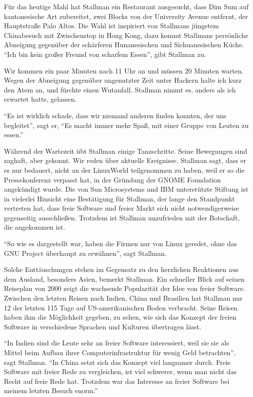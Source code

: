 Für das heutige Mahl hat Stallman ein Restaurant ausgesucht, dass Dim Sum auf kantonesische Art zubereitet, zwei Blocks von der University Avenue entfernt, der Hauptstraße Palo Altos. Die Wahl ist inspiriert von Stallmans jüngstem Chinabesuch mit Zwischenstop in Hong Kong, dazu kommt Stallmans persönliche Abneigung gegenüber der schärferen Hunanesischen und Sichuanesischen Küche. "`Ich bin kein großer Freund von scharfem Essen"', gibt Stallman zu.

Wir kommen ein paar Minuten nach 11 Uhr an und müssen 20 Minuten warten. Wegen der Abneigung gegenüber ungenutzter Zeit unter Hackern halte ich kurz den Atem an, und fürchte einen Wutanfall. Stallman nimmt es, anders als ich erwartet hatte, gelassen.

"`Es ist wirklich schade, dass wir niemand anderen finden konnten, der uns begleitet"', sagt er, "`Es macht immer mehr Spaß, mit einer Gruppe von Leuten zu essen."'

Während der Wartezeit übt Stallman einige Tanzschritte. Seine Bewegungen sind zaghaft, aber gekonnt. Wir reden über aktuelle Ereignisse. Stallman sagt, dass er es nur bedauert, nicht an der LinuxWorld teilgenommen zu haben, weil er so die Pressekonferenz verpasst hat, in der Gründung der GNOME Foundation angekündigt wurde. Die von Sun Microsystems und IBM unterstützte Stiftung ist in vielerlei Hinsicht eine Bestätigung für Stallman, der lange den Standpunkt vertreten hat, dass freie Software und freier Markt sich nicht notwendigerweise gegenseitig ausschließen. Trotzdem ist Stallman unzufrieden mit der Botschaft, die angekommen ist.

"`So wie es dargestellt war, haben die Firmen nur von Linux geredet, ohne das GNU Project überhaupt zu erwähnen"', sagt Stallman.

Solche Enttäuschungen stehen im Gegensatz zu den herzlichen Reaktionen aus dem Ausland, besonders Asien, bemerkt Stallman. Ein schneller Blick auf seinen Reiseplan von 2000 zeigt die wachsende Popularität der Idee von freier Software. Zwischen den letzten Reisen nach Indien, China und Brasilien hat Stallman nur 12 der letzten 115 Tage auf US-amerikanischen Boden verbracht. Seine Reisen haben ihm die Möglichkeit gegeben, zu sehen, wie sich das Konzept der freien Software in verschiedene Sprachen und Kulturen übertragen lässt.

"`In Indien sind die Leute sehr an freier Software interessiert, weil sie sie als Mittel beim Aufbau ihrer Computerinfrastruktur für wenig Geld betrachten"', sagt Stallman. "`In China setzt sich das Konzept viel langsamer durch. Freie Software mit freier Rede zu vergleichen, ist viel schwerer, wenn man nicht das Recht auf freie Rede hat. Trotzdem war das Interesse an freier Software bei meinem letzten Besuch enorm."'

